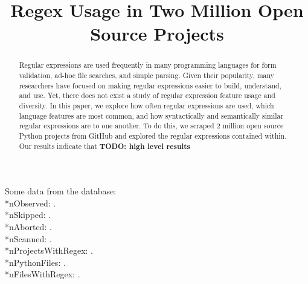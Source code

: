 \documentclass[conference]{IEEEtran}
\newcommand{\todo}[1]{\textbf{TODO: #1}}
\begin{document}
%
\title{Regex Usage in Two Million Open Source Projects}


\author{
}

\maketitle


\begin{abstract}
Regular expressions are used frequently in many programming languages for form validation,
ad-hoc file searches, and simple parsing. Given their popularity, many researchers have focused on
making regular expressions easier to build, understand, and use. Yet, there does not exist a study of
regular expression feature usage and diversity. In this paper, we explore how often regular expressions are used, which language features are most common, and how syntactically and semantically similar regular expressions are to one another. To do this, we scraped 2 million open source Python projects from GitHub and explored the regular expressions contained within. Our results indicate that \todo{high level results}
\end{abstract}













Some data from the database:
\\*nObserved: .
\\*nSkipped: .
\\*nAborted: .
\\*nScanned: .
\\*nProjectsWithRegex: .
\\*nPythonFiles: .
\\*nFilesWithRegex: .
\end{document}
